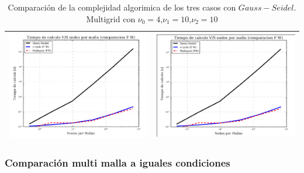 \documentclass[letter,10pt]{article}
\begin{document}
\begin{table}[H]
\centering
\caption{Comparación de la complejidad algorimica de los tres casos con $Gauss-Seidel$. Multigrid con $\nu_0=4$,$\nu_1=10$,$\nu_2=10$  }
\begin{tabular}[t]{|c|c|}
\hline
\includegraphics[scale=0.58]{img/tvsncompin10104}
&
\includegraphics[scale=0.58]{img/tvsncompfw10104}\\
\hline
\end{tabular}
\label{comp10104}

\end{table}

\subsubsection{Comparación multi malla a iguales condiciones}
\end{document}
